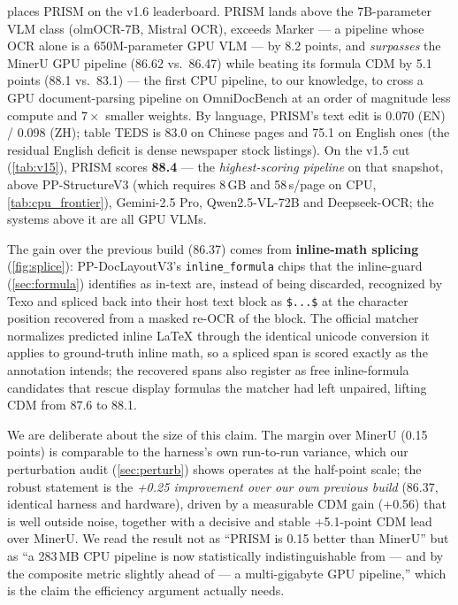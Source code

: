  places PRISM on the v1.6 leaderboard. PRISM lands above the 7B-parameter VLM class (olmOCR-7B, Mistral OCR), exceeds Marker --- a pipeline whose OCR alone is a 650M-parameter GPU VLM --- by 8.2 points, and \emph{surpasses} the MinerU GPU pipeline (86.62 vs.\ 86.47) while beating its formula CDM by 5.1 points (88.1 vs.\ 83.1) --- the first CPU pipeline, to our knowledge, to cross a GPU document-parsing pipeline on OmniDocBench at an order of magnitude less compute and $7\times$ smaller weights. By language, PRISM's text edit is 0.070 (EN) / 0.098 (ZH); table TEDS is 83.0 on Chinese pages and 75.1 on English ones (the residual English deficit is dense newspaper stock listings). On the v1.5 cut (\cref{tab:v15}), PRISM scores \textbf{88.4} --- the \emph{highest-scoring pipeline} on that snapshot, above PP-StructureV3 (which requires 8\,GB and 58\,s/page on CPU, \cref{tab:cpu_frontier}), Gemini-2.5 Pro, Qwen2.5-VL-72B and Deepseek-OCR; the systems above it are all GPU VLMs.

The gain over the previous build (86.37) comes from \textbf{inline-math splicing} (\cref{fig:splice}): PP-DocLayoutV3's \texttt{inline\_formula} chips that the inline-guard (\cref{sec:formula}) identifies as in-text are, instead of being discarded, recognized by Texo and spliced back into their host text block as \verb|$...$| at the character position recovered from a masked re-OCR of the block. The official matcher normalizes predicted inline \LaTeX{} through the identical unicode conversion it applies to ground-truth inline math, so a spliced span is scored exactly as the annotation intends; the recovered spans also register as free inline-formula candidates that rescue display formulas the matcher had left unpaired, lifting CDM from 87.6 to 88.1.

We are deliberate about the size of this claim. The margin over MinerU (0.15 points) is comparable to the harness's own run-to-run variance, which our perturbation audit (\cref{sec:perturb}) shows operates at the half-point scale; the robust statement is the \emph{+0.25 improvement over our own previous build} (86.37, identical harness and hardware), driven by a measurable CDM gain (+0.56) that is well outside noise, together with a decisive and stable +5.1-point CDM lead over MinerU. We read the result not as ``PRISM is 0.15 better than MinerU'' but as ``a 283\,MB CPU pipeline is now statistically indistinguishable from --- and by the composite metric slightly ahead of --- a multi-gigabyte GPU pipeline,'' which is the claim the efficiency argument actually needs.

